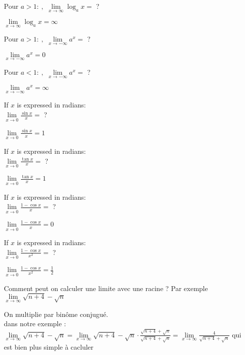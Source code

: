 \documentclass[12pt]{article}
\newcommand*{\xfield}[1]{\begin{mdframed}\centering #1\end{mdframed}\bigskip}
\newenvironment{note}{}{}
\begin{document}
\begin{note}
	\xfield{$\mbox{Pour } a > 1:\ ,$ $\lim\limits_{x \to \infty} \log_a x = $ ?}
	\xfield{$\lim\limits_{x \to \infty} \log_a x = \infty$}
\end{note}

\begin{note}
	\xfield{$\mbox{Pour } a > 1:\ ,$ $\lim\limits_{x \to -\infty} a^x = $ ?}
	\xfield{$\lim\limits_{x \to -\infty} a^x = 0$}
\end{note}

\begin{note}
	\xfield{$\mbox{Pour } a < 1:\ ,$ $\lim\limits_{x \to -\infty} a^x =$ ?}
	\xfield{$\lim\limits_{x \to -\infty} a^x = \infty$}
\end{note}

\begin{note}
	\xfield{If $x$ is expressed in radians:\\
	$\lim\limits_{x \to 0} \frac{\sin x}{x} =$ ?}
	\xfield{$\lim\limits_{x \to 0} \frac{\sin x}{x} = 1$}
\end{note}

\begin{note}
	\xfield{If $x$ is expressed in radians:\\
	$\lim\limits_{x \to 0} \frac{\tan x}{x} = $ ?}
	\xfield{$\lim\limits_{x \to 0} \frac{\tan x}{x} = 1$}
\end{note}

\begin{note}
	\xfield{If $x$ is expressed in radians:\\
	$\lim\limits_{x \to 0} \frac{1-\cos x}{x} =$ ?}
	\xfield{$\lim\limits_{x \to 0} \frac{1-\cos x}{x} = 0$}
\end{note}

\begin{note}
	\xfield{If $x$ is expressed in radians:\\
	$\lim\limits_{x \to 0} \frac{1-\cos x}{x^2} =$ ?}
	\xfield{$\lim\limits_{x \to 0} \frac{1-\cos x}{x^2} = \frac{1}{2}$}
\end{note}

\begin{note}
    \xfield{Comment peut on calculer une limite avec une racine ? Par exemple \\ $\lim\limits_{x \to \infty} \sqrt{n+4} - \sqrt{n}$}
    \xfield{On multiplie par binôme conjugué.\\dans notre exemple :\\ $\lim\limits_{x  \to \infty} \sqrt{n+4} - \sqrt{n} = \lim\limits_{x \to \infty} \sqrt{n+4} - \sqrt{n} \cdot \frac{\sqrt{n+4} + \sqrt{n}}{\sqrt{n+4} + \sqrt{n}} = \lim\limits_{x \to \infty} \frac{4}{\sqrt{n+4} + \sqrt{n}}$ qui est bien plus simple à cacluler}
\end{note}
\end{document}
